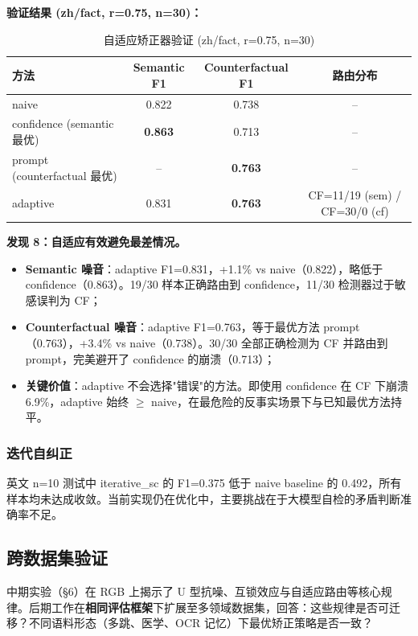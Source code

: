 \documentclass[UTF8,zihao=-4]{ctexart}
\begin{document}
\textbf{验证结果 (zh/fact, r=0.75, n=30)：}

\begin{table}[H]
  \centering
  \caption{自适应矫正器验证 (zh/fact, r=0.75, n=30)}
  \begin{tabular}{lccc}
    \toprule
    方法 & Semantic F1 & Counterfactual F1 & 路由分布 \\
    \midrule
    naive & 0.822 & 0.738 & -- \\
    confidence (semantic 最优) & \textbf{0.863} & 0.713 & -- \\
    prompt (counterfactual 最优) & -- & \textbf{0.763} & -- \\
    \midrule
    adaptive & 0.831 & \textbf{0.763} & CF=11/19 (sem) / CF=30/0 (cf) \\
    \bottomrule
  \end{tabular}
\end{table}

\textbf{发现 8：自适应有效避免最差情况。}
\begin{itemize}
  \item \textbf{Semantic 噪音}：adaptive F1=0.831，+1.1\% vs naive（0.822），略低于 confidence（0.863）。19/30 样本正确路由到 confidence，11/30 检测器过于敏感误判为 CF；
  \item \textbf{Counterfactual 噪音}：adaptive F1=0.763，等于最优方法 prompt（0.763），+3.4\% vs naive（0.738）。30/30 全部正确检测为 CF 并路由到 prompt，完美避开了 confidence 的崩溃（0.713）；
  \item \textbf{关键价值}：adaptive 不会选择"错误"的方法。即使用 confidence 在 CF 下崩溃 6.9\%，adaptive 始终 $\geq$ naive，在最危险的反事实场景下与已知最优方法持平。
\end{itemize}

\subsubsection{迭代自纠正}

英文 n=10 测试中 iterative\_sc 的 F1=0.375 低于 naive baseline 的 0.492，所有样本均未达成收敛。当前实现仍在优化中，主要挑战在于大模型自检的矛盾判断准确率不足。

\subsection{跨数据集验证}

中期实验（§6）在 RGB 上揭示了 U 型抗噪、互锁效应与自适应路由等核心规律。后期工作在\textbf{相同评估框架}下扩展至多领域数据集，回答：这些规律是否可迁移？不同语料形态（多跳、医学、OCR 记忆）下最优矫正策略是否一致？
\end{document}

